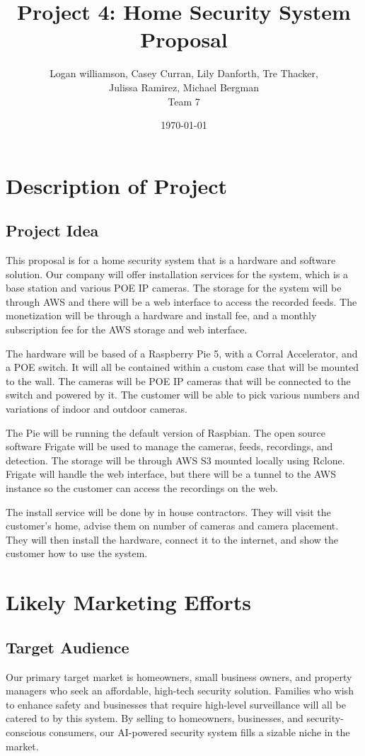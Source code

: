 \documentclass{report}
\title{Project 4: Home Security System Proposal}
\author{Logan williamson, Casey Curran, Lily Danforth, Tre Thacker, \\ Julissa Ramirez, Michael Bergman \\ Team 7}
\date{\today}
\begin{document}
\maketitle

\tableofcontents
\newpage

\chapter{Description of Project}
\section{Project Idea}
This proposal is for a home security system that is a hardware and software solution.
Our company will offer installation services for the system, which is a base station and various POE IP cameras.
The storage for the system will be through AWS and there will be a web interface to access the recorded feeds.
The monetization will be through a hardware and install fee, and a monthly subscription fee for the AWS storage and web interface.

The hardware will be based of a Raspberry Pie 5, with a Corral Accelerator, and a POE switch.
It will all be contained within a custom case that will be mounted to the wall.
The cameras will be POE IP cameras that will be connected to the switch and powered by it.
The customer will be able to pick various numbers and variations of indoor and outdoor cameras.

The Pie will be running the default version of Raspbian.
The open source software Frigate will be used to manage the cameras, feeds, recordings, and detection.
The storage will be through AWS S3 mounted locally using Rclone.
Frigate will handle the web interface, but there will be a tunnel to the AWS instance so the customer can access the recordings on the web.

The install service will be done by in house contractors.
They will visit the customer's home, advise them on number of cameras and camera placement.
They will then install the hardware, connect it to the internet, and show the customer how to use the system.


\chapter{Likely Marketing Efforts}
\section{Target Audience}
Our primary target market is homeowners, small business owners, and property managers who seek an affordable, high-tech security solution. 
Families who wish to enhance safety and businesses that require high-level surveillance will all be catered to by this system. 
By selling to homeowners, businesses, and security-conscious consumers, our AI-powered security system fills a sizable niche in the market. 
\end{document}
